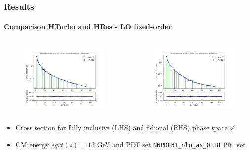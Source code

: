 \documentclass[aspectratio=43]{beamer}
\begin{document}
\begin{frame}

	\frametitle{Results}
	\framesubtitle{Comparison HTurbo and HRes - LO fixed-order}
	
	\footnotesize
	
	\begin{columns}
		
		
		\begin{figure}
			\includegraphics[width = 7cm]{plots/part3/chapter6/nlo-fo-1.png}
		\end{figure}
		
		
		\begin{figure}
			\includegraphics[width = 7cm]{plots/part3/chapter6/nlo-fo-fid-1.png}
		\end{figure}
		
	\end{columns}
	
	\begin{itemize}
		\item Cross section for fully inclusive (LHS) and fiducial (RHS) phase space {\color{darkgreen}$\checkmark$} 
		\item CM energy $sqrt(s) = 13$ GeV and PDF set \texttt{NNPDF31\_nlo\_as\_0118 PDF} set
	\end{itemize}

\end{frame}
\end{document}
